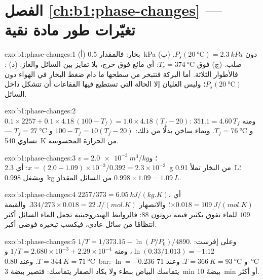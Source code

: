 \section*{الفصل \ref{ch:b1:phase-changes} --- تغيّرات طور مادة نقية}

\begin{solution}{exo:b1:phase-changes:1}
(أ) بخار: فالمقدار \qty{0.5}{kPa} دون $P_s(\qty{20}{\degreeCelsius}) = \qty{2.3}{kPa}$.
(ب) صلب. (ج) فوق $T_c = \qty{374}{\degreeCelsius}$: أي مائع فوق حرج، بلا
تمايز بين السائل والغاز. (د) : فالأطوار الثلاثة. أما البركة
فتتبخر من سطحها ما دام ضغط البخار في الهواء
دون $P_s(\qty{20}{\degreeCelsius})$؛ وليس الغليان إلا الحالة التي تستطيع
فيها الفقاعات أن تتشكل داخل السائل.
\end{solution}

\begin{solution}{exo:b1:phase-changes:2}
$0.1 \times 2257 + 0.1 \times 4.18\,(100 - T_f) = 1.0 \times 4.18\,(T_f - 20)$:
ومنه $351.1 = 4.60\,T_f$ و $T_f = \qty{76}{\degreeCelsius}$. وبماء ساخن
بدلًا من ذلك: $100 - T_f = 10(T_f - 20)$ و $T_f = \qty{27}{\degreeCelsius}$ ---  تساوي \qty{540}{K} من الحرارة المحسوسة.
\end{solution}

\begin{solution}{exo:b1:phase-changes:3}
$v = \qty{2.0e-3}{m^3/kg}$؛ و $x = (2.0 - 1.09) \times 10^{-3}/0.392 = 2.3 \times 10^{-3}$:
أي \qty{2.3}{g} من البخار تملأ \qty{0.91}{L}؛ ويشغل \qty{0.998}{kg} من السائل
المقدارَ $0.998 \times 1.09 = \qty{1.09}{L}$.
\end{solution}

\begin{solution}{exo:b1:phase-changes:4}
$2257/373 = \qty{6.05}{kJ/(kg.K)}$، أي $\times 0.018 = \qty{109}{J/(mol.K)}$؛
والانصهار $334/273 \times 0.018 = \qty{22}{J/(mol.K)}$. والقيمة $109$ للماء تفوق
بكثير قيمة تروتون $88$: فالروابط الهيدروجينية تجعل الماء السائل أكثر انتظامًا
من سائل عادي، فيكسب تبخيره فوضى أكبر.
\end{solution}

\begin{solution}{exo:b1:phase-changes:5}
$1/T = 1/373.15 - \ln(P/P_0)/4890$. وعلى إفرست: $\ln(0.33/1.013) = -1.12$،
ومنه $1/T = 2.680 \times 10^{-3} + 2.29 \times 10^{-4}$ و $T = \qty{344}{K} =
\qty{71}{\degreeCelsius}$. وعند \qty{0.80}{bar}: $\ln = -0.236$ و $T = \qty{366}{K} =
\qty{93}{\degreeCelsius}$. وعند \qty{71}{\degreeCelsius} يتماسك البياض ببطء
ولا يكاد الصفار يتماسك: فتصير بيضة \qty{3}{min} بيضةَ
\qty{10}{min} أو أكثر.
\end{solution}

